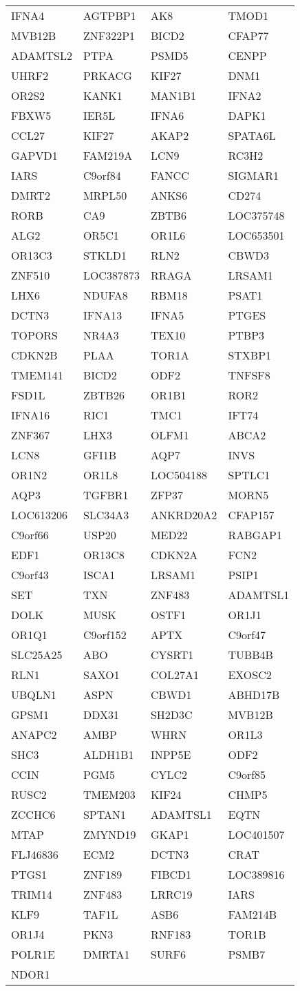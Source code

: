 {\begin{longtable}{llll}
IFNA4&AGTPBP1&AK8&TMOD1\tabularnewline
MVB12B&ZNF322P1&BICD2&CFAP77\tabularnewline
ADAMTSL2&PTPA&PSMD5&CENPP\tabularnewline
UHRF2&PRKACG&KIF27&DNM1\tabularnewline
OR2S2&KANK1&MAN1B1&IFNA2\tabularnewline
FBXW5&IER5L&IFNA6&DAPK1\tabularnewline
CCL27&KIF27&AKAP2&SPATA6L\tabularnewline
GAPVD1&FAM219A&LCN9&RC3H2\tabularnewline
IARS&C9orf84&FANCC&SIGMAR1\tabularnewline
DMRT2&MRPL50&ANKS6&CD274\tabularnewline
RORB&CA9&ZBTB6&LOC375748\tabularnewline
ALG2&OR5C1&OR1L6&LOC653501\tabularnewline
OR13C3&STKLD1&RLN2&CBWD3\tabularnewline
ZNF510&LOC387873&RRAGA&LRSAM1\tabularnewline
LHX6&NDUFA8&RBM18&PSAT1\tabularnewline
DCTN3&IFNA13&IFNA5&PTGES\tabularnewline
TOPORS&NR4A3&TEX10&PTBP3\tabularnewline
CDKN2B&PLAA&TOR1A&STXBP1\tabularnewline
TMEM141&BICD2&ODF2&TNFSF8\tabularnewline
FSD1L&ZBTB26&OR1B1&ROR2\tabularnewline
IFNA16&RIC1&TMC1&IFT74\tabularnewline
ZNF367&LHX3&OLFM1&ABCA2\tabularnewline
LCN8&GFI1B&AQP7&INVS\tabularnewline
OR1N2&OR1L8&LOC504188&SPTLC1\tabularnewline
AQP3&TGFBR1&ZFP37&MORN5\tabularnewline
LOC613206&SLC34A3&ANKRD20A2&CFAP157\tabularnewline
C9orf66&USP20&MED22&RABGAP1\tabularnewline
\newpage
EDF1&OR13C8&CDKN2A&FCN2\tabularnewline
C9orf43&ISCA1&LRSAM1&PSIP1\tabularnewline
SET&TXN&ZNF483&ADAMTSL1\tabularnewline
DOLK&MUSK&OSTF1&OR1J1\tabularnewline
OR1Q1&C9orf152&APTX&C9orf47\tabularnewline
SLC25A25&ABO&CYSRT1&TUBB4B\tabularnewline
RLN1&SAXO1&COL27A1&EXOSC2\tabularnewline
UBQLN1&ASPN&CBWD1&ABHD17B\tabularnewline
GPSM1&DDX31&SH2D3C&MVB12B\tabularnewline
ANAPC2&AMBP&WHRN&OR1L3\tabularnewline
SHC3&ALDH1B1&INPP5E&ODF2\tabularnewline
CCIN&PGM5&CYLC2&C9orf85\tabularnewline
RUSC2&TMEM203&KIF24&CHMP5\tabularnewline
ZCCHC6&SPTAN1&ADAMTSL1&EQTN\tabularnewline
MTAP&ZMYND19&GKAP1&LOC401507\tabularnewline
FLJ46836&ECM2&DCTN3&CRAT\tabularnewline
PTGS1&ZNF189&FIBCD1&LOC389816\tabularnewline
TRIM14&ZNF483&LRRC19&IARS\tabularnewline
KLF9&TAF1L&ASB6&FAM214B\tabularnewline
OR1J4&PKN3&RNF183&TOR1B\tabularnewline
POLR1E&DMRTA1&SURF6&PSMB7\tabularnewline
NDOR1&&&\tabularnewline
\bottomrule
\end{longtable}}
\addtocounter{table}{-1}
